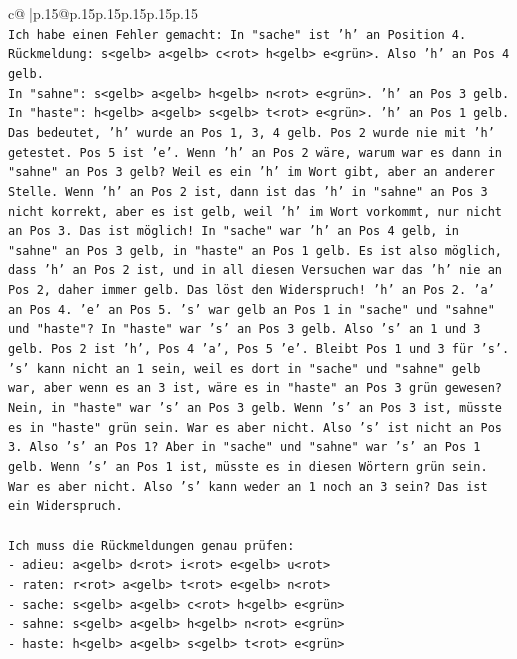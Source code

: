 \documentclass{article}
\begin{document}
{\begin{supertabular}{c@{$\;$}|p{.15\linewidth}@{}p{.15\linewidth}p{.15\linewidth}p{.15\linewidth}p{.15\linewidth}p{.15\linewidth}}
{{{\\ 
\texttt{Ich habe einen Fehler gemacht: In "sache" ist 'h' an Position 4. Rückmeldung: s<gelb> a<gelb> c<rot> h<gelb> e<grün>. Also 'h' an Pos 4 gelb. } \\
\texttt{In "sahne": s<gelb> a<gelb> h<gelb> n<rot> e<grün>. 'h' an Pos 3 gelb.} \\
\texttt{In "haste": h<gelb> a<gelb> s<gelb> t<rot> e<grün>. 'h' an Pos 1 gelb.} \\
\texttt{Das bedeutet, 'h' wurde an Pos 1, 3, 4 gelb. Pos 2 wurde nie mit 'h' getestet. Pos 5 ist 'e'. Wenn 'h' an Pos 2 wäre, warum war es dann in "sahne" an Pos 3 gelb? Weil es ein 'h' im Wort gibt, aber an anderer Stelle. Wenn 'h' an Pos 2 ist, dann ist das 'h' in "sahne" an Pos 3 nicht korrekt, aber es ist gelb, weil 'h' im Wort vorkommt, nur nicht an Pos 3. Das ist möglich! In "sache" war 'h' an Pos 4 gelb, in "sahne" an Pos 3 gelb, in "haste" an Pos 1 gelb. Es ist also möglich, dass 'h' an Pos 2 ist, und in all diesen Versuchen war das 'h' nie an Pos 2, daher immer gelb. Das löst den Widerspruch! 'h' an Pos 2. 'a' an Pos 4. 'e' an Pos 5. 's' war gelb an Pos 1 in "sache" und "sahne" und "haste"? In "haste" war 's' an Pos 3 gelb. Also 's' an 1 und 3 gelb. Pos 2 ist 'h', Pos 4 'a', Pos 5 'e'. Bleibt Pos 1 und 3 für 's'. 's' kann nicht an 1 sein, weil es dort in "sache" und "sahne" gelb war, aber wenn es an 3 ist, wäre es in "haste" an Pos 3 grün gewesen? Nein, in "haste" war 's' an Pos 3 gelb. Wenn 's' an Pos 3 ist, müsste es in "haste" grün sein. War es aber nicht. Also 's' ist nicht an Pos 3. Also 's' an Pos 1? Aber in "sache" und "sahne" war 's' an Pos 1 gelb. Wenn 's' an Pos 1 ist, müsste es in diesen Wörtern grün sein. War es aber nicht. Also 's' kann weder an 1 noch an 3 sein? Das ist ein Widerspruch. } \\
\\ 
\texttt{Ich muss die Rückmeldungen genau prüfen:} \\
\texttt{{-} adieu: a<gelb> d<rot> i<rot> e<gelb> u<rot>} \\
\texttt{{-} raten: r<rot> a<gelb> t<rot> e<gelb> n<rot>} \\
\texttt{{-} sache: s<gelb> a<gelb> c<rot> h<gelb> e<grün>} \\
\texttt{{-} sahne: s<gelb> a<gelb> h<gelb> n<rot> e<grün>} \\
\texttt{{-} haste: h<gelb> a<gelb> s<gelb> t<rot> e<grün>} \\
\\ 
}}}
\end{supertabular}}
\end{document}
